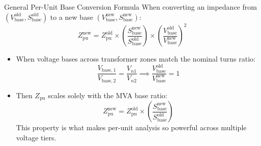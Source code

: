 \begin{frame}{General Per-Unit Base Conversion Formula}
When converting an impedance from $(V_{\text{base}}^{\text{old}}, S_{\text{base}}^{\text{old}})$ to a new base $(V_{\text{base}}^{\text{new}}, S_{\text{base}}^{\text{new}})$:
$$Z_{\text{pu}}^{\text{new}} = Z_{\text{pu}}^{\text{old}} \times \left( \frac{S_{\text{base}}^{\text{new}}}{S_{\text{base}}^{\text{old}}} \right) \times \left( \frac{V_{\text{base}}^{\text{old}}}{V_{\text{base}}^{\text{new}}} \right)^2$$

\begin{itemize}
    \item When voltage bases across transformer zones match the nominal turns ratio:
    $$\frac{V_{\text{base}, 1}}{V_{\text{base}, 2}} = \frac{V_{n1}}{V_{n2}} \implies \frac{V_{\text{base}}^{\text{old}}}{V_{\text{base}}^{\text{new}}} = 1$$
    \item Then $Z_{\text{pu}}$ scales \alert{solely with the MVA base ratio}:
    $$Z_{\text{pu}}^{\text{new}} = Z_{\text{pu}}^{\text{old}} \times \left( \frac{S_{\text{base}}^{\text{new}}}{S_{\text{base}}^{\text{old}}} \right)$$
    This property is what makes per-unit analysis so powerful across multiple voltage tiers.
\end{itemize}
\end{frame}


